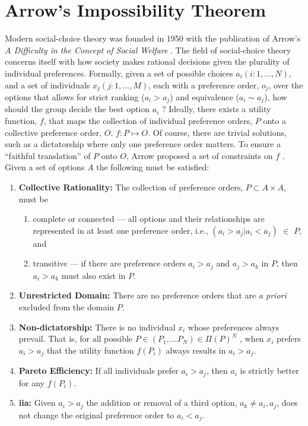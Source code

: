 \section{Arrow's Impossibility Theorem}
\label{section:arrows-thm}

Modern social-choice theory was founded in 1950 with the publication of Arrow's
\textit{A Difficulty in the Concept of Social Welfare}
\cite{arrow_difficulty_1950}. The field of social-choice theory concerns itself
with how society makes rational decisions given the plurality of individual
preferences. Formally, given a set of possible choices $a_i (i: 1,..., N)$, and
a set of individuals $x_j (j:1, ...,M)$, each with a preference order, $o_j$,
over the options that allows for strict ranking ($a_i > a_j$) and equivalence
($a_i \sim a_j$), how should the group decide the best option $a_i$
\cite{franssen_arrows_2005}? Ideally, there exists a utility function, $f$, that
maps the collection of individual preference orders, $P$ onto a collective
preference order, $O$. $f: P \mapsto O$. Of course, there are trivial solutions,
such as a dictatorship where only one preference order matters. To ensure a
``faithful translation'' of $P$ onto $O$, Arrow proposed a set of constraints on
$f$ \cite{arrow_difficulty_1950,franssen_arrows_2005}. Given a set of options
$A$ the following must be satisfied:
\begin{enumerate}
    \item \textbf{Collective Rationality:} The collection of preference orders,
    $P \subset A\times A$, must be
    \begin{enumerate}
        \item complete or connected --- all options and their relationships are
        represented in at least one preference order, i.e., $(a_i > a_j | a_i <
        a_j)$ $\in$ $P$, and
        \item transitive --- if there are preference orders $a_i > a_j$ and $a_j
        > a_k$ in $P$, then $a_i > a_k$ must also exist in $P$.
    \end{enumerate}
    \item \textbf{Unrestricted Domain:} There are no preference orders that are
    \textit{a priori} excluded from the domain $P$.
    \item \textbf{Non-dictatorship:} There is no individual $x_i$ whose
    preferences always prevail. That is, for all possible $P \in (P_1, ... P_N)
    \in \Pi(P)^N$ , when $x_i$ prefers $a_i > a_j$ that the utility function
    $f(P_i)$ always results in $a_i > a_j$.
    \item \textbf{Pareto Efficiency:} If all individuals prefer $a_i > a_j$,
    then $a_i$ is strictly better for any $f(P_i)$.
    \item \textbf{\Ac{iia}:} Given $a_i > a_j$ the addition or removal of a
    third option, $a_k \neq a_i, a_j$, does not change the original preference
    order to $a_i < a_j$.
\end{enumerate}

